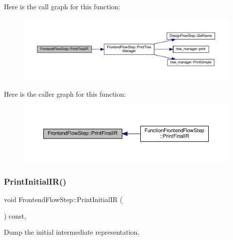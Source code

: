Here is the call graph for this function\+:
\nopagebreak
\begin{figure}[H]
\begin{center}
\leavevmode
\includegraphics[width=350pt]{d9/d37/classFrontendFlowStep_a2a9b475fe6e3739803cb4e6afdc94a01_cgraph}
\end{center}
\end{figure}
Here is the caller graph for this function\+:
\nopagebreak
\begin{figure}[H]
\begin{center}
\leavevmode
\includegraphics[width=350pt]{d9/d37/classFrontendFlowStep_a2a9b475fe6e3739803cb4e6afdc94a01_icgraph}
\end{center}
\end{figure}
\mbox{\label{classFrontendFlowStep_aa4082589c5838cc22e2b4ea7097b5c16}} 
\subsubsection{\texorpdfstring{Print\+Initial\+I\+R()}{PrintInitialIR()}}
{\footnotesize\ttfamily void Frontend\+Flow\+Step\+::\+Print\+Initial\+IR (\begin{DoxyParamCaption}{ }\end{DoxyParamCaption}) const\hspace{0.3cm}{\ttfamily [override]}, {\ttfamily [virtual]}}



Dump the initial intermediate representation. 



